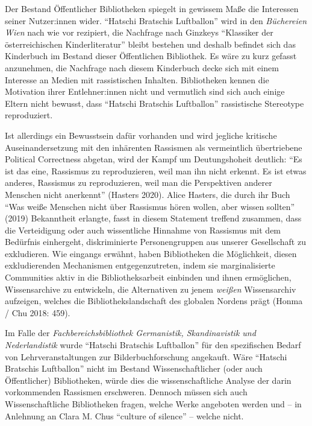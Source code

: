 \documentclass[a4paper,
fontsize=11pt,
oneside,
numbers=noperiodatend,
parskip=half-,
bibliography=totoc,
final
]{scrartcl}
\begin{document}
Der Bestand Öffentlicher Bibliotheken spiegelt in gewissem Maße die
Interessen seiner Nutzer:innen wider. \enquote{Hatschi Bratschis Luftballon}
wird in den \emph{Büchereien Wien} nach wie vor rezipiert, die Nachfrage
nach Ginzkeys \enquote{Klassiker der österreichischen Kinderliteratur} bleibt
bestehen und deshalb befindet sich das Kinderbuch im Bestand dieser
Öffentlichen Bibliothek. Es wäre zu kurz gefasst anzunehmen, die
Nachfrage nach diesem Kinderbuch decke sich mit einem Interesse an
Medien mit rassistischen Inhalten. Bibliotheken kennen die Motivation
ihrer Entlehner:innen nicht und vermutlich sind sich auch einige Eltern
nicht bewusst, dass \enquote{Hatschi Bratschis Luftballon} rassistische
Stereotype reproduziert.

Ist allerdings ein Bewusstsein dafür vorhanden und wird jegliche
kritische Auseinandersetzung mit den inhärenten Rassismen als
vermeintlich übertriebene Political Correctness abgetan, wird der Kampf
um Deutungshoheit deutlich: \enquote{Es ist das eine, Rassismus zu
reproduzieren, weil man ihn nicht erkennt. Es ist etwas anderes,
Rassismus zu reproduzieren, weil man die Perspektiven anderer Menschen
nicht anerkennt} (Hasters 2020). Alice Hasters, die durch ihr Buch
\enquote{Was weiße Menschen nicht über Rassismus hören wollen, aber wissen
sollten} (2019) Bekanntheit erlangte, fasst in diesem Statement
treffend zusammen, dass die Verteidigung oder auch wissentliche Hinnahme
von Rassismus mit dem Bedürfnis einhergeht, diskriminierte
Personengruppen aus unserer Gesellschaft zu exkludieren. Wie eingangs
erwähnt, haben Bibliotheken die Möglichkeit, diesen exkludierenden
Mechanismen entgegenzutreten, indem sie marginalisierte Communities
aktiv in die Bibliotheksarbeit einbinden und ihnen ermöglichen,
Wissensarchive zu entwickeln, die Alternativen zu jenem \emph{weißen}
Wissensarchiv aufzeigen, welches die Bibliothekslandschaft des globalen
Nordens prägt (Honma / Chu 2018: 459).

Im Falle der \emph{Fachbereichsbibliothek Germanistik, Skandinavistik
und Nederlandistik} wurde \enquote{Hatschi Bratschis Luftballon} für den
spezifischen Bedarf von Lehrveranstaltungen zur Bilderbuchforschung
angekauft. Wäre \enquote{Hatschi Bratschis Luftballon} nicht im Bestand
Wissenschaftlicher (oder auch Öffentlicher) Bibliotheken, würde dies die
wissenschaftliche Analyse der darin vorkommenden Rassismen erschweren.
Dennoch müssen sich auch Wissenschaftliche Bibliotheken fragen, welche
Werke angeboten werden und -- in Anlehnung an Clara M. Chus \enquote{culture of
silence} -- welche nicht.
\end{document}
